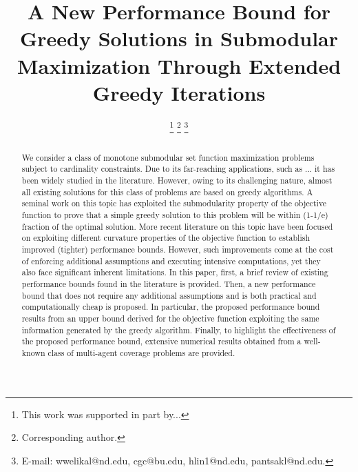 \documentclass[conference]{IEEEtran}
\begin{document}
\title{{\LARGE \textbf{
A New Performance Bound for Greedy Solutions in Submodular Maximization Through Extended Greedy Iterations
}}}

\author{



\thanks{This work was supported in part by...
}
\thanks{ Corresponding author.}
\thanks{E-mail: wwelikal@nd.edu, cgc@bu.edu, hlin1@nd.edu, pantsakl@nd.edu.}}
\maketitle

\begin{abstract}
We consider a class of monotone submodular set function maximization problems subject to cardinality constraints. Due to its far-reaching applications,  {\color{red} such as ...} it has been widely studied in the literature. However, owing to its challenging nature, almost all existing solutions for this class of problems are based on greedy algorithms. A seminal work on this topic has exploited the submodularity property of the objective function to prove that a simple greedy solution to this problem will be within (1-1/e) fraction of the optimal solution. More recent literature on this topic have been focused on exploiting different curvature properties of the objective function to establish improved (tighter) performance bounds. However, such improvements come at the cost of enforcing additional assumptions and executing intensive computations, yet they also face significant inherent limitations. 
In this paper, first, a brief review of existing performance bounds found in the literature is provided. Then, a new performance bound that does not require any additional assumptions and is both practical and computationally cheap is proposed. In particular, the proposed performance bound results from an upper bound derived for the objective function exploiting the same information generated by the greedy algorithm. Finally, to highlight the effectiveness of the proposed performance bound, extensive numerical results obtained from a well-known class of multi-agent coverage problems are provided. 


\end{abstract}
\end{document}
